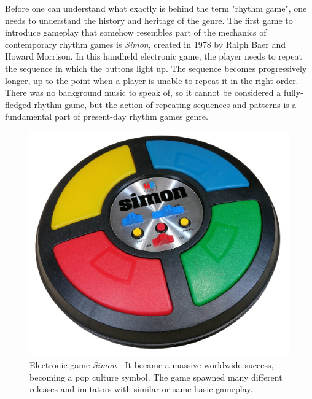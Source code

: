 Before one can understand what exactly is behind the term "rhythm game", one needs to understand the history and heritage of the genre. The first game to introduce gameplay that somehow resembles part of the mechanics of contemporary rhythm games is \textit{Simon}, created in 1978 by Ralph Baer and Howard Morrison. In this handheld electronic game, the player needs to repeat the sequence in which the buttons light up. The sequence becomes progressively longer, up to the point when a player is unable to repeat it in the right order. There was no background music to speak of, so it cannot be considered a fully-fledged rhythm game, but the action of repeating sequences and patterns is a fundamental part of present-day rhythm games genre.

\begin{figure}[h]
    \centering\includegraphics[scale=0.05]{obrazki/simon.jpg}
    \caption{Electronic game \textit{Simon} - It became a massive worldwide success, becoming a pop culture symbol. The game spawned many different releases and imitators with similar or same basic gameplay. \cite{simongame}}
    \label{fig:simon_game}
\end{figure}

